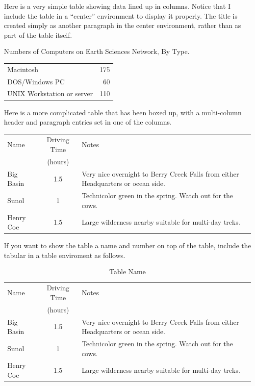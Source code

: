 \documentclass[11pt]{article}
\begin{document}
Here is a very simple table showing data lined up in columns.
Notice that I include the table in a ``center'' environment to display
it properly.
The title is created simply as another paragraph in the center environment,
rather than as part of the table itself.
\begin{center}
Numbers of Computers on Earth Sciences Network, By Type.

\begin{tabular}{lr}
Macintosh&175\\
DOS/Windows PC&60\\
UNIX Workstation or server&110\\
\end{tabular}
\end{center}

Here is a more complicated table that has been boxed up, with a multi-column
header and paragraph entries set in one of the columns.
\begin{center}
\begin{tabular}{|l|c|p{3.5in}|}
\hline
Name&Driving Time&Notes\\
&(hours)&\\ \hline
Big Basin&1.5&Very nice overnight to Berry Creek Falls from
either Headquarters or ocean side.\\ \hline
Sunol&1&Technicolor green in the spring.  Watch out for the cows.\\ \hline
Henry Coe&1.5&Large wilderness nearby suitable for multi-day treks.\\ \hline
\end{tabular}
\end{center}

If you want to show the table a name and number on top of the table, include the tabular in a table enviroment as follows.
\begin{table}
\caption{Table Name}
\begin{center}
\begin{tabular}{|l|c|p{3.5in}|}
\hline
Name&Driving Time&Notes\\
&(hours)&\\ \hline
Big Basin&1.5&Very nice overnight to Berry Creek Falls from
either Headquarters or ocean side.\\ \hline
Sunol&1&Technicolor green in the spring.  Watch out for the cows.\\ \hline
Henry Coe&1.5&Large wilderness nearby suitable for multi-day treks.\\ \hline
\end{tabular}
\end{center}
\end{table}
\end{document}
